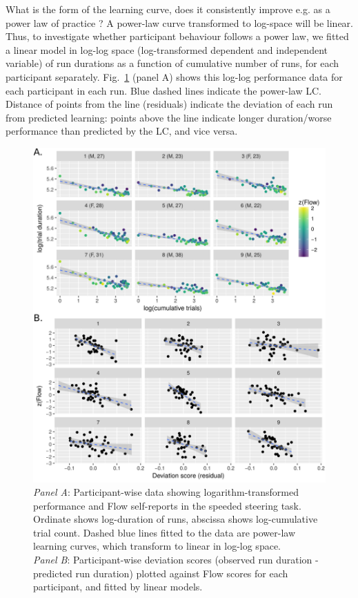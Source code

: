\documentclass[fleqn,10pt]{wlscirep}
\begin{document}
What is the form of the learning curve, does it consistently improve e.g. as a power law of practice \cite{Newell1982}? A power-law curve transformed to log-space will be linear. Thus, to investigate whether participant behaviour follows a power law, we fitted a linear model in log-log space (log-transformed dependent and independent variable) of run durations as a function of cumulative number of runs, for each participant separately. Fig.~\ref{fig:flowVperf} (panel A) shows this log-log performance data for each participant in each run. Blue dashed lines indicate the power-law LC. Distance of points from the line (residuals) indicate the deviation of each run from predicted learning: points above the line indicate longer duration/worse performance than predicted by the LC, and vice versa.

\begin{figure}[!p]
	\centering
	\includegraphics[width=\linewidth]{cogcar_main}
	\caption{{\it Panel A}: Participant-wise data showing logarithm-transformed performance and Flow self-reports in the speeded steering task. Ordinate shows log-duration of runs, abscissa shows log-cumulative trial count. Dashed blue lines fitted to the data are power-law learning curves, which transform to linear in log-log space.\\
  {\it Panel B}: Participant-wise deviation scores (observed run duration - predicted run duration) plotted against Flow scores for each participant, and fitted by linear models.}
	\label{fig:flowVperf}
\end{figure}
\end{document}
